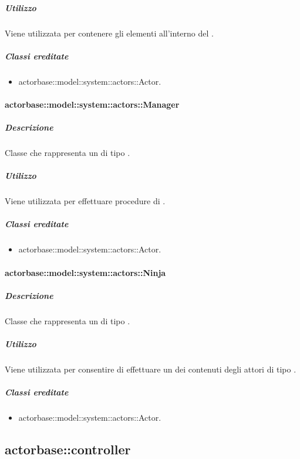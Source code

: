 \documentclass{scalatekids-article}
\begin{document}
\subparagraph{Utilizzo}

Viene utilizzata per contenere gli elementi all'interno del .

\subparagraph{Classi ereditate}

\begin{itemize}
\item actorbase::model::system::actors::Actor.
\end{itemize}

\paragraph{actorbase::model::system::actors::Manager}

\subparagraph{Descrizione}

Classe che rappresenta un  di tipo .

\subparagraph{Utilizzo}

Viene utilizzata per effettuare procedure di .

\subparagraph{Classi ereditate}

\begin{itemize}
\item actorbase::model::system::actors::Actor.
\end{itemize}

\paragraph{actorbase::model::system::actors::Ninja}

\subparagraph{Descrizione}

Classe che rappresenta un  di tipo .

\subparagraph{Utilizzo}

Viene utilizzata per consentire di effettuare un  dei contenuti
degli attori di tipo .

\subparagraph{Classi ereditate}

\begin{itemize}
\item actorbase::model::system::actors::Actor.
\end{itemize}

\subsection{actorbase::controller}
\end{document}
